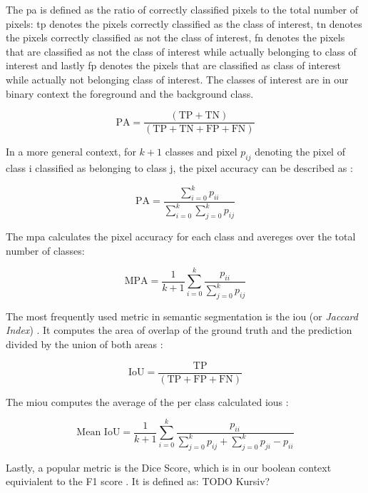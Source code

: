 \documentclass[11pt,
  paper=a4, 
  bibliography=totocnumbered,
	captions=tableheading,
	BCOR=10mm
]{scrreprt}
\theoremstyle{definition}
\newcommand{\TP}{\text{TP}}
\newcommand{\TN}{\text{TN}}
\newcommand{\FP}{\text{FP}}
\newcommand{\FN}{\text{FN}}
\begin{document}
The \gls{pa} is defined as the ratio of correctly classified pixels to the total number of pixels:
\gls{tp} denotes the pixels correctly classified as the class of interest, 
\gls{tn} denotes the pixels correctly classified as not the class of interest, 
\gls{fn} denotes the pixels that are classified as not the class of interest while actually belonging to class of interest and lastly
\gls{fp} denotes the pixels that are classified as class of interest while actually not belonging class of interest.
The classes of interest are in our binary context the foreground and the background class.

\begin{equation}
	\text{PA} = \frac{(\TP + \TN)}{(\TP + \TN + \FP + \FN)}
\end{equation}

In a more general context, for $k + 1$ classes and pixel $p_{ij}$ denoting the pixel of class i classified as belonging to class j, the pixel accuracy can be described as \cite{Garcia-Garcia2018}:

\begin{equation}
	\text{PA} = \frac{\sum_{i=0}^{k}p_{ii}}{\sum_{i=0}^{k}\sum_{j=0}^{k}p_{ij}}
\end{equation}

The \gls{mpa} calculates the pixel accuracy for each class and avereges over the total number of classes:

\begin{equation}
	\text{MPA} = \frac{1}{k+1}\sum_{i=0}^{k}\frac{p_{ii}}{\sum_{j=0}^{k}p_{ij}}
\end{equation}


The most frequently used metric in semantic segmentation is the \gls{iou} (or \textit{Jaccard Index}) \cite{Minaee2020}.
It computes the area of overlap of the ground truth and the prediction divided by the union of both areas \cite{Garcia-Garcia2018}:

\begin{equation}
	\text{IoU} = \frac{\TP}{(\TP + \FP + \FN)}
\end{equation}


The \gls{miou} computes the average of the per class calculated \glspl{iou} \cite{Garcia-Garcia2018}:

\begin{equation}
	\text{Mean IoU} = \frac{1}{k+1} \sum_{i=0}^{k} \frac{p_{ii}}{\sum_{j=0}^{k} p_{ij} + \sum_{j=0}^{k} p_{ji}-p_{ii}}
\end{equation}

Lastly, a popular metric is the Dice Score, which is in our boolean context equivialent to the F1 score \cite{Minaee2020}. It is defined as: TODO Kursiv?
\end{document}
